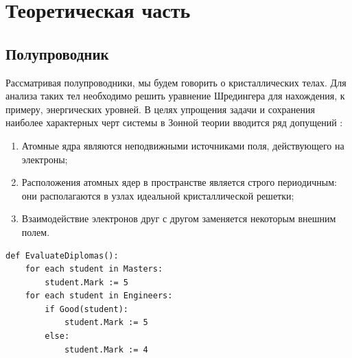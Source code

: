 \chapter{Теоретическая часть}
\section{Полупроводник}
Рассматривая полупроводники, мы будем говорить о кристаллических телах. Для анализа таких тел необходимо решить уравнение Шредингера для нахождения, к примеру, энергических уровней. В целях упрощения задачи и сохранения наиболее характерных черт системы в Зонной теории вводится ряд допущений \cite{Kalashnikov}: 
\begin{enumerate}
	\item Атомные ядра являются неподвижными источниками поля, действующего на электроны;
	\item Расположения атомных ядер в пространстве является строго периодичным: они располагаются в узлах идеальной кристаллической решетки;
	\item Взаимодействие электронов друг с другом заменяется некоторым внешним полем.
\end{enumerate}

\begin{lstlisting}[style=pseudocode,caption={Алгоритм оценки дипломных работ}]
def EvaluateDiplomas():
    for each student in Masters:
        student.Mark := 5
    for each student in Engineers:
        if Good(student):
            student.Mark := 5
        else:
            student.Mark := 4
\end{lstlisting}

